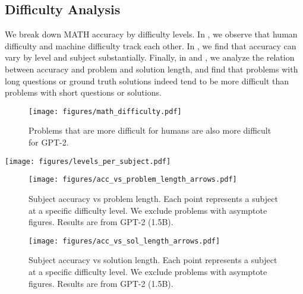 \documentclass{article}
\begin{document}
\subsection{Difficulty Analysis}\label{app:difficulty_analysis}
We break down MATH accuracy by difficulty levels. In , we observe that human difficulty and machine difficulty track each other. In , we find that accuracy can vary by level and subject substantially. Finally, in  and , we analyze the relation between accuracy and problem and solution length, and find that problems with long questions or ground truth solutions indeed tend to be more difficult than problems with short questions or solutions.

\begin{figure}[h]
    \centering
    \texttt{[image: figures/math\_difficulty.pdf]}
    \caption{Problems that are more difficult for humans are also more difficult for GPT-2.}
    \label{fig:difficulty_analysis}
\end{figure}

\begin{figure*}[h]
    \centering
    \texttt{[image: figures/levels\_per\_subject.pdf]}
    \caption{Accuracy per subject per difficulty level.}
    \label{fig:levels_by_subject}
\end{figure*}

\begin{figure*}[h]
\begin{subfigure}{.49\textwidth}
\centering
\texttt{[image: figures/acc\_vs\_problem\_length\_arrows.pdf]}
\caption{Subject accuracy vs problem length. Each point represents a subject at a specific difficulty level. We exclude problems with asymptote figures. Results are from GPT-2 (1.5B).}\label{fig:problength}
\end{subfigure}\hfill \begin{subfigure}{.49\textwidth}
\centering
\texttt{[image: figures/acc\_vs\_sol\_length\_arrows.pdf]}
\caption{Subject accuracy vs solution length. Each point represents a subject at a specific difficulty level. We exclude problems with asymptote figures. Results are from GPT-2 (1.5B).}\label{fig:sollen}
\end{subfigure}
\end{figure*}
\end{document}
